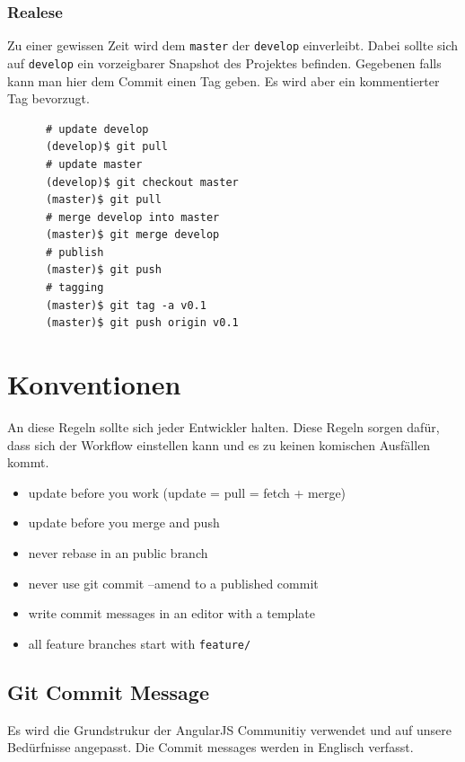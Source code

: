 \documentclass[
   draft=false
  ,paper=a4
  ,twoside=false
  ,fontsize=11pt
  ,headsepline
  ,DIV=11
  ,parskip=full+
  ,titlepage
]{scrartcl} %
\begin{document}
  \subsubsection{Realese}
  
  \begin{minipage}[t]{0.25\linewidth}
     Zu einer gewissen Zeit wird dem \texttt{master} der \texttt{develop}
     einverleibt. Dabei sollte sich auf \texttt{develop} ein vorzeigbarer
     Snapshot des Projektes befinden. Gegebenen falls kann man hier 
     dem Commit einen Tag geben. 
     Es wird aber ein kommentierter Tag bevorzugt.
  \end{minipage}%
  \hfill
  \begin{minipage}[t]{0.65\linewidth}
    \begin{lstlisting}
      # update develop
      (develop)$ git pull
      # update master
      (develop)$ git checkout master
      (master)$ git pull
      # merge develop into master
      (master)$ git merge develop
      # publish
      (master)$ git push
      # tagging
      (master)$ git tag -a v0.1
      (master)$ git push origin v0.1
    \end{lstlisting}
  \end{minipage}%
  
\newpage
  
\section{Konventionen}
  An diese Regeln sollte sich jeder Entwickler halten. Diese Regeln
  sorgen dafür, dass sich der Workflow einstellen kann und es zu keinen
  komischen Ausfällen kommt.
\begin{itemize}
	\item update before you work (update = pull = fetch + merge)
	\item update before you merge and push
	\item never rebase in an public branch
	\item never use git commit --amend to a published commit
	\item write commit messages in an editor with a template 
	\item all feature branches start with \texttt{feature/}
\end{itemize}
	\newpage
\subsection{Git Commit Message}
  Es wird die Grundstrukur der AngularJS Communitiy \citep{AngularJS}
  verwendet und auf unsere Bedürfnisse angepasst. 
  Die Commit messages werden in Englisch verfasst.
  
\end{document}
